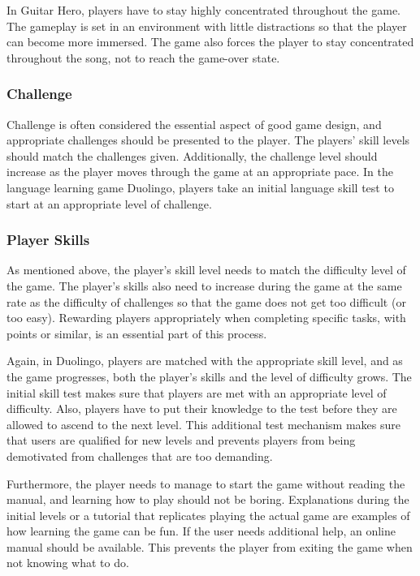 \documentclass[../Main.tex]{subfiles}
\begin{document}
In Guitar Hero, players have to stay highly concentrated throughout the game. The gameplay is set in an environment with little distractions so that the player can become more immersed. The game also forces the player to stay concentrated throughout the song, not to reach the game-over state.

\subsubsection{Challenge}
Challenge is often considered the essential aspect of good game design, and appropriate challenges should be presented to the player. The players’ skill levels should match the challenges given. Additionally, the challenge level should increase as the player moves through the game at an appropriate pace. In the language learning game Duolingo, players take an initial language skill test to start at an appropriate level of challenge.

\subsubsection{Player Skills}
As mentioned above, the player’s skill level needs to match the difficulty level of the game. The player’s skills also need to increase during the game at the same rate as the difficulty of challenges so that the game does not get too difficult (or too easy). Rewarding players appropriately when completing specific tasks, with points or similar, is an essential part of this process.

Again, in Duolingo, players are matched with the appropriate skill level, and as the game progresses, both the player’s skills and the level of difficulty grows. The initial skill test makes sure that players are met with an appropriate level of difficulty. Also, players have to put their knowledge to the test before they are allowed to ascend to the next level. This additional test mechanism makes sure that users are qualified for new levels and prevents players from being demotivated from challenges that are too demanding.

Furthermore, the player needs to manage to start the game without reading the manual, and learning how to play should not be boring. Explanations during the initial levels or a tutorial that replicates playing the actual game are examples of how learning the game can be fun. If the user needs additional help, an online manual should be available. This prevents the player from exiting the game when not knowing what to do.
\end{document}
